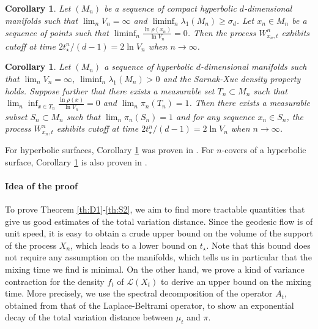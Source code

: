 \documentclass[]{scrartcl}
\newtheorem{corollary}[theorem]{Corollary}
\numberwithin{equation}{section}
\numberwithin{figure}{section}
\begin{document}
\begin{corollary}{}\label{coro:Brownianmixing1}
Let $(M_n)$ be a sequence of compact hyperbolic $d$-dimensional manifolds such that $\lim_n V_n = \infty$ and  $\liminf_n \lambda_1(M_n) \geq \sigma_d$. Let $x_n \in M_n$ be a sequence of points such that $\liminf_n \frac {\ln  \rho(x_n)}{\ln V_n} = 0$. 
	Then the process $W^n_{x_n,t}$ exhibits cutoff at time $2  t^n_\star / (d-1)  = 2 \ln V_n$ when $n \to \infty$.
\end{corollary}

\begin{corollary}{}\label{coro:Brownianmixing2}
	Let $(M_n)$ a sequence of hyperbolic $d$-dimensional manifolds such that  $\lim_n V_n = \infty$, $\liminf_n \lambda_1(M_n) >0$ and the Sarnak-Xue density property holds. Suppose further that there exists a measurable set $T_n \subset M_n$ such that $\lim_n \inf_{x \in T_n} \frac{\ln \rho(x)}{\ln V_n} = 0$ and $\lim_n \pi_n(T_n) = 1$. Then there exists a measurable subset $S_n \subset M_n$ such that $\lim_n \pi_n(S_n) =1$ and for any sequence $x_n \in S_n$, the process $W^n_{x_n,t}$ exhibits cutoff at time $2  t^n_\star / (d-1) = 2 \ln V_n$ when $n \to \infty$.
\end{corollary}

For hyperbolic surfaces, Corollary \ref{coro:Brownianmixing1} was proven in \cite{Golubev}. For $n$-covers of a hyperbolic surface, Corollary \ref{coro:Brownianmixing2} is also proven in \cite{Golubev}.


\paragraph{Idea of the proof}
	To prove Theorem \ref{th:D1}-\ref{th:S2}, we aim to find more tractable quantities that give us good estimates of the total variation distance.
	Since the geodesic flow is of unit speed, it is easy to obtain a crude upper bound on the volume of the support of the process $X_n$, which leads to a lower bound on $t_\star$. Note that this bound does not require any assumption on the manifolds, which tells us in particular that the mixing time we find is minimal.
	On the other hand, we prove a kind of variance contraction for the density $f_t$ of $\mathcal L(X_t)$ to derive an upper bound on the mixing time. More precisely, we use the spectral decomposition of the operator $A_t$, obtained from that of the Laplace-Beltrami operator, to show an exponential decay of the total variation distance between $\mu_t$ and $\pi$.
	
\end{document}
